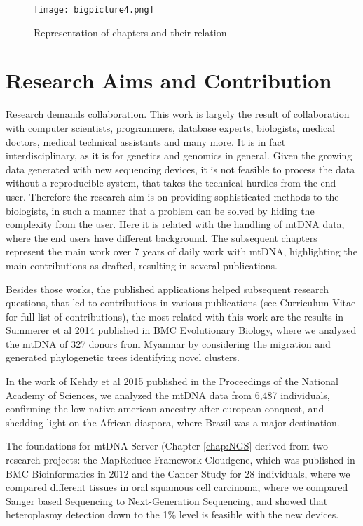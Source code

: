 \begin{figure}[ht]
\begin{center}
\texttt{[image: bigpicture4.png]}
\caption[Representation of chapters]{Representation of chapters and their relation}
\label{fig:figureBigPic}
\end{center}
\end{figure}

\section{Research Aims and Contribution}
Research demands collaboration. This work is largely the result of collaboration with computer scientists, programmers, database experts, biologists, medical doctors, medical technical assistants and many more. It is in fact interdisciplinary, as it is for genetics and genomics in general. Given the growing data generated with new sequencing devices, it is not feasible to process the data without a reproducible system, that takes the technical hurdles from the end user. Therefore the research aim is on providing sophisticated methods to the biologists, in such a manner that a problem can be solved by hiding the complexity from the user. Here it is related with the handling of mtDNA data, where the end users have different background. The subsequent chapters represent the main work over 7 years of daily work with mtDNA, highlighting the main contributions as drafted, resulting in several publications. 

Besides those works, the published applications helped subsequent research questions, that led to contributions in various publications (see Curriculum Vitae for full list of contributions), the most related with this work are the results in Summerer et al 2014 published in BMC Evolutionary Biology, \cite{Summerer2014} where we analyzed the mtDNA of 327 donors from Myanmar by considering the migration and generated phylogenetic trees identifying novel clusters. 

In the work of Kehdy et al 2015 \cite{Kehdy2015} published in the Proceedings of the National Academy of Sciences, we analyzed the mtDNA data from 6,487 individuals, confirming the low native-american ancestry after european conquest, and shedding light on the African diaspora, where Brazil was a major destination.

The foundations for mtDNA-Server (Chapter \ref{chap:NGS} derived from two research projects: the MapReduce Framework Cloudgene\cite{Schonherr2012}, which was published in BMC Bioinformatics in 2012 and the Cancer Study for 28 individuals, where we compared different tissues in oral squamous cell carcinoma\cite{Kloss-Brandstatter2015}, where we compared Sanger based Sequencing to Next-Generation Sequencing, and showed that heteroplasmy detection down to the 1\% level is feasible with the new devices. 

